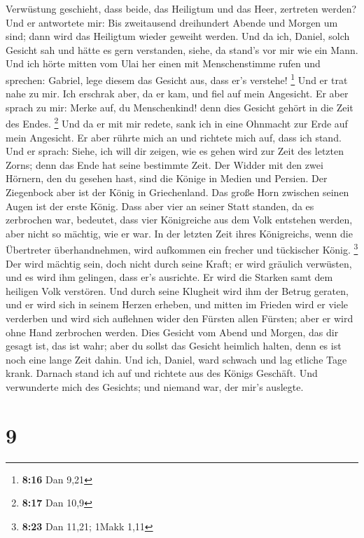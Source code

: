 Verwüstung geschieht, dass beide, das Heiligtum und das Heer, zertreten
werden?  Und er antwortete mir: Bis zweitausend
dreihundert Abende und Morgen um sind; dann wird das Heiligtum wieder
geweiht werden.  Und da ich, Daniel, solch Gesicht sah
und hätte es gern verstanden, siehe, da stand's vor mir wie ein Mann.
 Und ich hörte mitten vom Ulai her einen mit
Menschenstimme rufen und sprechen: Gabriel, lege diesem das Gesicht aus,
dass er's verstehe! \footnote{\textbf{8:16} Dan 9,21} 
Und er trat nahe zu mir. Ich erschrak aber, da er kam, und fiel auf mein
Angesicht. Er aber sprach zu mir: Merke auf, du Menschenkind! denn dies
Gesicht gehört in die Zeit des Endes. \footnote{\textbf{8:17} Dan 10,9}
 Und da er mit mir redete, sank ich in eine Ohnmacht zur
Erde auf mein Angesicht. Er aber rührte mich an und richtete mich auf,
dass ich stand.  Und er sprach: Siehe, ich will dir
zeigen, wie es gehen wird zur Zeit des letzten Zorns; denn das Ende hat
seine bestimmte Zeit.  Der Widder mit den zwei Hörnern,
den du gesehen hast, sind die Könige in Medien und Persien.
 Der Ziegenbock aber ist der König in Griechenland. Das
große Horn zwischen seinen Augen ist der erste König. 
Dass aber vier an seiner Statt standen, da es zerbrochen war, bedeutet,
dass vier Königreiche aus dem Volk entstehen werden, aber nicht so
mächtig, wie er war.  In der letzten Zeit ihres
Königreichs, wenn die Übertreter überhandnehmen, wird aufkommen ein
frecher und tückischer König. \footnote{\textbf{8:23} Dan 11,21; 1Makk
  1,11}  Der wird mächtig sein, doch nicht durch seine
Kraft; er wird gräulich verwüsten, und es wird ihm gelingen, dass er's
ausrichte. Er wird die Starken samt dem heiligen Volk verstören.
 Und durch seine Klugheit wird ihm der Betrug geraten,
und er wird sich in seinem Herzen erheben, und mitten im Frieden wird er
viele verderben und wird sich auflehnen wider den Fürsten allen Fürsten;
aber er wird ohne Hand zerbrochen werden.  Dies Gesicht
vom Abend und Morgen, das dir gesagt ist, das ist wahr; aber du sollst
das Gesicht heimlich halten, denn es ist noch eine lange Zeit dahin.
 Und ich, Daniel, ward schwach und lag etliche Tage
krank. Darnach stand ich auf und richtete aus des Königs Geschäft. Und
verwunderte mich des Gesichts; und niemand war, der mir's auslegte.

\hypertarget{section-8}{%
\section{9}\label{section-8}}

